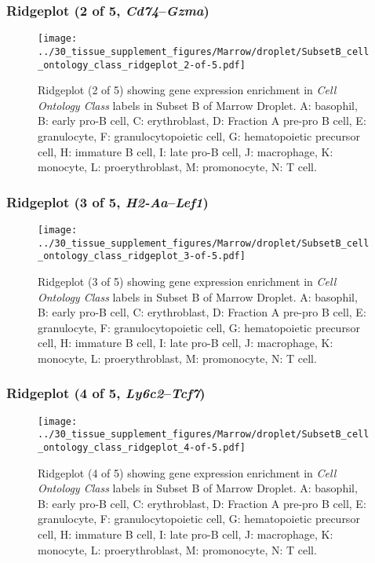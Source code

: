 \clearpage

\subsubsection{Ridgeplot (2 of 5, \emph{Cd74}--\emph{Gzma})}
\begin{figure}[h]
\centering
\texttt{[image: ../30\_tissue\_supplement\_figures/Marrow/droplet/SubsetB\_cell\_ontology\_class\_ridgeplot\_2-of-5.pdf]}

\caption{ Ridgeplot (2 of 5)  showing gene expression enrichment in \emph{Cell Ontology Class} labels in Subset B of Marrow Droplet. A: basophil, B: early pro-B cell, C: erythroblast, D: Fraction A pre-pro B cell, E: granulocyte, F: granulocytopoietic cell, G: hematopoietic precursor cell, H: immature B cell, I: late pro-B cell, J: macrophage, K: monocyte, L: proerythroblast, M: promonocyte, N: T cell.}
\end{figure}


\clearpage

\subsubsection{Ridgeplot (3 of 5, \emph{H2-Aa}--\emph{Lef1})}
\begin{figure}[h]
\centering
\texttt{[image: ../30\_tissue\_supplement\_figures/Marrow/droplet/SubsetB\_cell\_ontology\_class\_ridgeplot\_3-of-5.pdf]}

\caption{ Ridgeplot (3 of 5)  showing gene expression enrichment in \emph{Cell Ontology Class} labels in Subset B of Marrow Droplet. A: basophil, B: early pro-B cell, C: erythroblast, D: Fraction A pre-pro B cell, E: granulocyte, F: granulocytopoietic cell, G: hematopoietic precursor cell, H: immature B cell, I: late pro-B cell, J: macrophage, K: monocyte, L: proerythroblast, M: promonocyte, N: T cell.}
\end{figure}


\clearpage

\subsubsection{Ridgeplot (4 of 5, \emph{Ly6c2}--\emph{Tcf7})}
\begin{figure}[h]
\centering
\texttt{[image: ../30\_tissue\_supplement\_figures/Marrow/droplet/SubsetB\_cell\_ontology\_class\_ridgeplot\_4-of-5.pdf]}

\caption{ Ridgeplot (4 of 5)  showing gene expression enrichment in \emph{Cell Ontology Class} labels in Subset B of Marrow Droplet. A: basophil, B: early pro-B cell, C: erythroblast, D: Fraction A pre-pro B cell, E: granulocyte, F: granulocytopoietic cell, G: hematopoietic precursor cell, H: immature B cell, I: late pro-B cell, J: macrophage, K: monocyte, L: proerythroblast, M: promonocyte, N: T cell.}
\end{figure}


